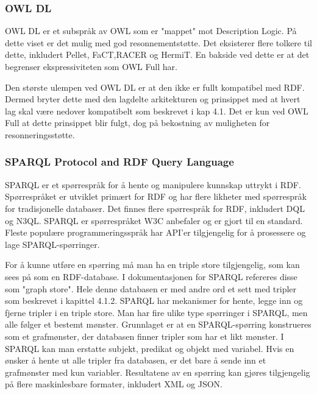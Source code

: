 \subsubsection{OWL DL}
OWL DL er et subspråk av OWL som er "mappet" mot Description Logic. På dette viset er det mulig med god resonnementstøtte. Det eksisterer flere tolkere til dette, inkludert Pellet, FaCT,RACER og HermiT. En bakside ved dette er at det begrenser ekspressiviteten som OWL Full har. 

Den største ulempen ved OWL DL er at den ikke er fullt kompatibel med RDF. Dermed bryter dette med den lagdelte arkitekturen og prinsippet med at hvert lag skal være nedover kompatibelt som beskrevet i kap 4.1. Det er kun ved OWL Full at dette prinsippet blir fulgt, dog på bekostning av muligheten for resonneringsstøtte.    

\subsubsection{SPARQL Protocol and RDF Query Language}
SPARQL er et spørrespråk for å hente og manipulere kunnskap uttrykt i RDF. Spørrespråket er utviklet primært for RDF og har flere likheter med spørrespråk for tradisjonelle databaser. Det finnes flere spørrespråk for RDF, inkludert DQL og N3QL. SPARQL er spørrespråket W3C anbefaler og er gjort til en standard. Fleste populære programmeringsspråk har API'er tilgjengelig for å prosessere og lage SPARQL-spørringer.

For å kunne utføre en spørring må man ha en triple store tilgjengelig, som kan sees på som en RDF-database. I dokumentasjonen for SPARQL refereres disse som "graph store". Hele denne databasen er med andre ord et sett med tripler som beskrevet i kapittel 4.1.2. SPARQL har mekanismer for hente, legge inn og fjerne tripler i en triple store. Man har fire ulike type spørringer i SPARQL, men alle følger et bestemt mønster. Grunnlaget er at en SPARQL-spørring konstrueres som et grafmønster, der databasen finner tripler som har et likt mønster. I SPARQL kan man erstatte subjekt, predikat og objekt med variabel. Hvis en ønsker å hente ut alle tripler fra databasen, er det bare å sende inn et grafmønster med kun variabler. Resultatene av en spørring kan gjøres tilgjengelig på flere maskinlesbare formater, inkludert XML og JSON.

